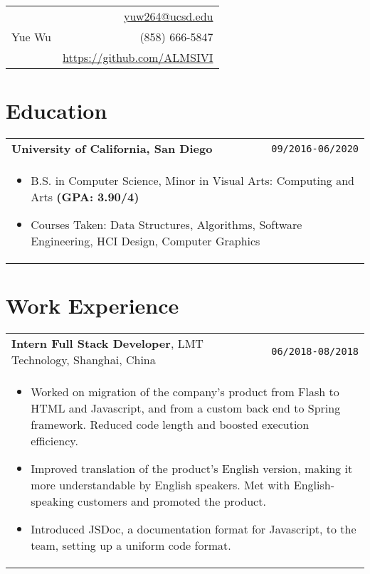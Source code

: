 \documentclass[10pt, letterpaper]{article}
\newcommand{\itemcols}[1]{
	\multicolumn{2}{p{\dimexpr \linewidth-2\tabcolsep}}{
	\begin{itemize}
		#1
	\end{itemize}
	}
}
\begin{document}
\noindent
\begin{tabularx}{\linewidth}{X r}
	\multirow{3}{*}{{\fontsize{40}{50}\selectfont Yue Wu}}
	& \href{mailto:yuw264@ucsd.edu}{yuw264@ucsd.edu} \\
	& (858) 666-5847 \\
	& \href{https://github.com/ALMSIVI}{https://github.com/ALMSIVI}
\end{tabularx}

\begin{comment}
\noindent
\textbf{Currently looking for a software engineering intern for Summer 2019 (Jun-Sep).}
\end{comment}

\begin{comment}
\begin{tabularx}{\linewidth}{X r}
\multirow{4}{*}{{\fontsize{45}{60}\selectfont Yue Wu}} 
& \href{mailto:yuw264@ucsd.edu}{yuw264@ucsd.edu} \\
& (858) 666-5847 \\
& 8840 Costa Verde Blvd. Apt. 3322 \\
& San Diego, CA 92122
\end{tabularx}
\end{comment}


\section{Education}
\smallskip
\noindent
\begin{tabularx}{\linewidth}{X r}
	\textbf{\large University of California, San Diego} & \texttt{09/2016-06/2020} \\
	\itemcols{
		\item B.S. in Computer Science, Minor in Visual Arts: Computing and Arts \textbf{(GPA: 3.90/4)}
		\item Courses Taken: Data Structures, Algorithms, Software Engineering, HCI Design, Computer Graphics
	}
\end{tabularx}


\section{Work Experience}
\smallskip
\noindent
\begin{tabularx}{\textwidth}{X r}
	\textbf{\large Intern Full Stack Developer}, LMT Technology, Shanghai, China & \texttt{06/2018-08/2018} \\
	\itemcols{
		\item Worked on migration of the company's product from Flash to HTML and Javascript, and from a custom back end to Spring framework. Reduced code length and boosted execution efficiency.
		\item Improved translation of the product's English version, making it more understandable by English speakers. Met with English-speaking customers and promoted the product. 
		\item Introduced JSDoc, a documentation format for Javascript, to the team, setting up a uniform code format.
	} 
\end{tabularx}
\end{document}
